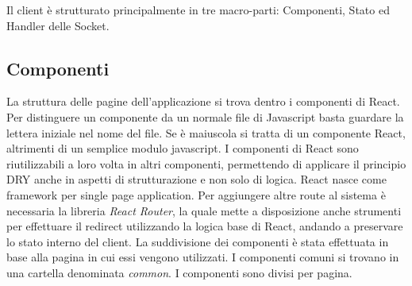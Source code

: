 \noindent Il client è strutturato principalmente in tre macro-parti: Componenti, Stato ed Handler delle Socket.

\subsection{Componenti}
La struttura delle pagine dell'applicazione si trova dentro i componenti di React.
Per distinguere un componente da un normale file di Javascript basta guardare la lettera iniziale nel nome del file. Se è maiuscola si tratta di un componente React, altrimenti di un semplice modulo javascript.\newline
I componenti di React sono riutilizzabili a loro volta in altri componenti, permettendo di applicare il principio DRY anche in aspetti di strutturazione e non solo di logica.\newline
React nasce come framework per single page application. Per aggiungere altre route al sistema è necessaria la libreria \textit{React Router}, la quale mette a disposizione anche strumenti per effettuare il redirect utilizzando la logica base di React, andando a preservare lo stato interno del client.\newline
La suddivisione dei componenti è stata effettuata in base alla pagina in cui essi vengono utilizzati. I componenti comuni si trovano in una cartella denominata \textit{common}.
I componenti sono divisi per pagina.

